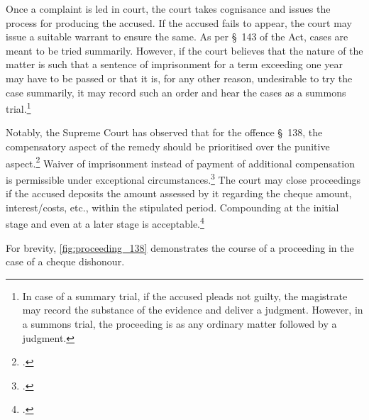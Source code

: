 Once a complaint is led in court, the court takes cognisance and issues the process for producing the accused. If the accused fails to appear, the court may issue a suitable warrant to ensure the same. As per \S~143 of the Act, cases are meant to be tried summarily. However, if the court believes that the nature of the matter is such that a sentence of imprisonment for a term exceeding one year may have to be passed or that it is, for any other reason, undesirable to try the case summarily, it may record such an order and hear the cases as a summons trial.\footnote{In case of a summary trial, if the accused pleads not guilty, the magistrate may record the substance of the evidence and deliver a judgment. However, in a summons trial, the proceeding is as any ordinary matter followed by a judgment.}

Notably, the Supreme Court has observed that for the offence \S~138, the compensatory aspect of the remedy should be prioritised over the punitive aspect.\footcite{sc2010_damodar} Waiver of imprisonment instead of payment of additional compensation is permissible under exceptional circumstances.\footcite{sc2018_priyanka} The court may close proceedings if the accused deposits the amount assessed by it regarding the cheque amount, interest/costs, etc., within the stipulated period. Compounding at the initial stage and even at a later stage is acceptable.\footcite{sc2018_meters} 

For brevity, \cref{fig:proceeding_138} demonstrates the course of a proceeding in the case of a cheque dishonour.

